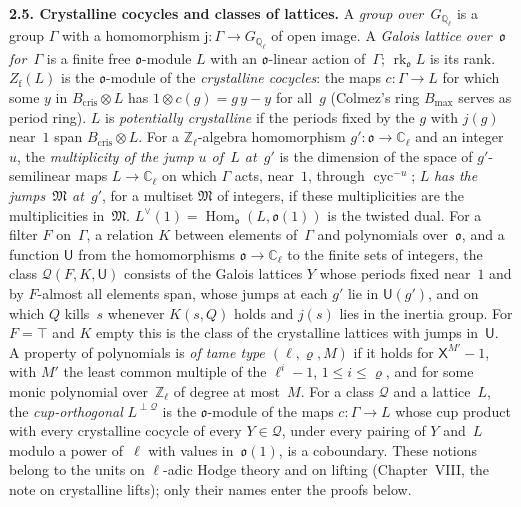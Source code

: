 \documentclass[11pt,a4paper]{article}
\newcommand{\Hom}{\operatorname{Hom}}
\newcommand{\m}[1]{\mbox{$#1$}}        %
\newcommand{\subhead}[1]{\par\addvspace{9pt plus 2pt}\Needspace{4\baselineskip}\noindent\textbf{#1}\enspace\ignorespaces}
\theoremstyle{plainx}
\theoremstyle{uprightx}
\newcommand{\Zl}{\mathbb{Z}_\ell}
\newcommand{\Cl}{\mathbb{C}_\ell}
\newcommand{\Gl}{G_{\mathbb{Q}_\ell}}
\newcommand{\cyc}{\operatorname{cyc}}
\newcommand{\fo}{\mathfrak{o}}
\newcommand{\rk}{\operatorname{rk}}
\newcommand{\Zf}{Z_{\mathrm{f}}}
\begin{document}
\subhead{2.5. Crystalline cocycles and classes of lattices.} A \emph{group over~\m{\Gl}} is a group $\Gamma$ with
a homomorphism \m{\mathsf{j}\colon\Gamma\to\Gl} of open image. A \emph{Galois lattice over~$\fo$ for~$\Gamma$} is a finite free
$\fo$-module $L$ with an $\fo$-linear action of~$\Gamma$; \m{\rk_{\fo}L} is its rank. \m{\Zf(L)} is the
$\fo$-module of the \emph{crystalline cocycles}: the maps \m{c\colon\Gamma\to L} for which some $y$ in
\m{B_{\mathrm{cris}}\otimes L} has \m{1\otimes c(g)=g\,y-y} for all~$g$ (Colmez's ring $B_{\max}$ serves as period
ring). $L$ is \emph{potentially crystalline} if the periods fixed by the $g$ with \m{j(g)} near~$1$ span
\m{B_{\mathrm{cris}}\otimes L}. For a \m{\Zl}-algebra homomorphism \m{g'\colon\fo\to\Cl} and an integer~$u$, the
\emph{multiplicity of the jump $u$ of~$L$ at~$g'$} is the dimension of the space of $g'$-semilinear maps
\m{L\to\Cl} on which $\Gamma$ acts, near~$1$, through \m{\cyc^{-u}}; $L$ \emph{has the jumps~$\mathfrak{M}$ at~$g'$}, for a
multiset $\mathfrak{M}$ of integers, if these multiplicities are the multiplicities in~$\mathfrak{M}$. \m{L^{\vee}(1)=\Hom_{\fo}(L,\fo(1))}
is the twisted dual. For a filter $F$ on~$\Gamma$, a relation $K$ between elements of~$\Gamma$ and polynomials
over~$\fo$, and a function $\mathsf{U}$ from the homomorphisms \m{\fo\to\Cl} to the finite sets of integers, the class
\m{\mathcal{Q}(F,K,\mathsf{U})} consists of the Galois lattices $Y$ whose periods fixed near~$1$ and by $F$-almost all
elements span, whose jumps at each $g'$ lie in \m{\mathsf{U}(g')}, and on which $Q$ kills~$s$ whenever \m{K(s,Q)} holds
and \m{j(s)} lies in the inertia group. For \m{F=\top} and $K$ empty this is the class of the crystalline lattices
with jumps in~$\mathsf{U}$. A property of polynomials is \emph{of tame type \m{(\ell,\varrho,M)}} if it holds for
\m{\mathsf{X}^{M'}-1}, with $M'$ the least common multiple of the \m{\ell^{i}-1}, \m{1\le i\le\varrho}, and for some monic polynomial
over~\m{\Zl} of degree at most~$M$. For a class $\mathcal{Q}$ and a lattice~$L$, the \emph{cup-orthogonal}
\m{L^{\perp\mathcal{Q}}} is the $\fo$-module of the maps \m{c\colon\Gamma\to L} whose cup product with every
crystalline cocycle of every \m{Y\in\mathcal{Q}}, under every pairing of $Y$ and~$L$ modulo a power of~$\ell$ with
values in~\m{\fo(1)}, is a coboundary. These notions belong to the units on $\ell$-adic Hodge theory and on
lifting (Chapter~VIII, the note on crystalline lifts); only their names enter the proofs below.
\end{document}
